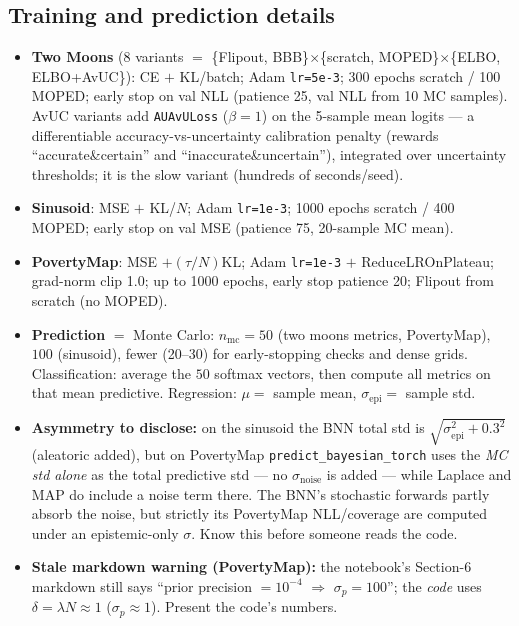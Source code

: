 \documentclass[10pt,a4paper]{article}
\newcommand{\code}[1]{\texttt{#1}}
\begin{document}
\subsection{Training and prediction details}
\begin{itemize}
\item \textbf{Two Moons} (8 variants $=$ \{Flipout, BBB\}$\times$\{scratch, MOPED\}$\times$\{ELBO,
  ELBO+AvUC\}): CE $+$ KL/batch; Adam \code{lr=5e-3}; 300 epochs scratch / 100 MOPED; early stop on
  val NLL (patience 25, val NLL from 10 MC samples). AvUC variants add
  \code{AUAvULoss} ($\beta{=}1$) on the 5-sample mean logits --- a differentiable
  accuracy-vs-uncertainty calibration penalty (rewards ``accurate\&certain'' and
  ``inaccurate\&uncertain''), integrated over uncertainty thresholds; it is the slow variant
  (hundreds of seconds/seed).
\item \textbf{Sinusoid}: MSE $+$ KL/$N$; Adam \code{lr=1e-3}; 1000 epochs scratch / 400 MOPED;
  early stop on val MSE (patience 75, 20-sample MC mean).
\item \textbf{PovertyMap}: MSE $+(\tau/N)$KL; Adam \code{lr=1e-3} $+$ ReduceLROnPlateau; grad-norm
  clip 1.0; up to 1000 epochs, early stop patience 20; Flipout from scratch (no MOPED).
\item \textbf{Prediction} $=$ Monte Carlo: $n_{\text{mc}}=50$ (two moons metrics, PovertyMap),
  $100$ (sinusoid), fewer (20--30) for early-stopping checks and dense grids.
  Classification: average the $50$ softmax vectors, then compute all metrics on that mean
  predictive. Regression: $\mu=$ sample mean, $\sigma_{\text{epi}}=$ sample std.
\item \textbf{Asymmetry to disclose:} on the sinusoid the BNN total std is
  $\sqrt{\sigma_{\text{epi}}^2+0.3^2}$ (aleatoric added), but on PovertyMap
  \code{predict\_bayesian\_torch} uses the \emph{MC std alone} as the total predictive std ---
  no $\sigma_{\text{noise}}$ is added --- while Laplace and MAP do include a noise term there.
  The BNN's stochastic forwards partly absorb the noise, but strictly its PovertyMap NLL/coverage
  are computed under an epistemic-only $\sigma$. Know this before someone reads the code.
\item \textbf{Stale markdown warning (PovertyMap):} the notebook's Section-6 markdown still says
  ``prior precision $=10^{-4}$ $\Rightarrow$ $\sigma_p=100$''; the \emph{code} uses
  $\delta=\lambda N\approx1$ ($\sigma_p\approx1$). Present the code's numbers.
\end{itemize}
\end{document}
